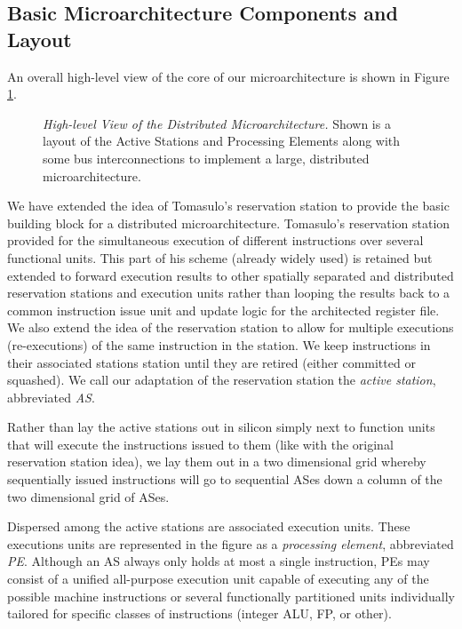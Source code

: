 \documentclass[10pt,dvips]{article}
\begin{document}
\subsection{Basic Microarchitecture Components and Layout}
%
An overall high-level view of the core of our microarchitecture is shown in 
Figure \ref{fig:window}.

\begin{figure}
\vspace{0.2 in}
\setlength{\epsfxsize}{10cm}%
\centerline{}
\caption{{\em High-level View of the Distributed Microarchitecture.} 
Shown is a layout of the Active Stations and Processing Elements
along with some bus interconnections to implement a large,
distributed microarchitecture.}
\label{fig:window}
\end{figure}

We have extended the idea of Tomasulo's reservation
station \cite{Tom67} to provide the basic building block for a distributed
microarchitecture.  Tomasulo's reservation station provided for the
simultaneous execution of different instructions over several
functional units.  This part of his scheme (already widely used) is
retained but extended to forward execution results to other spatially
separated and distributed reservation stations and execution units
rather than looping the results back to a common instruction issue unit
and update logic for the architected register file.  We also extend the idea
of the reservation station to allow for multiple executions (re-executions)
of the same instruction in the station.  We keep 
instructions in their associated stations station until they are retired 
(either committed or 
squashed).  
We call our adaptation of the reservation station the
\textit{active station}, abbreviated \textit{AS}.  

Rather than lay the active stations out in silicon simply next to
function units that will execute the instructions issued to them
(like with the original reservation station idea),
we lay them out in a two dimensional grid whereby sequentially
issued instructions will go to sequential ASes down a column of
the two dimensional grid of ASes. 

Dispersed among the active stations are associated execution
units.  These executions units are represented in the figure as
a \textit{processing element}, abbreviated \textit{PE}.  
Although an AS always only holds at most a single instruction,
PEs may consist of a unified all-purpose execution unit capable of
executing any of the possible machine instructions or
several functionally partitioned units individually tailored
for specific classes of instructions (integer ALU, FP, or other).
\end{document}

